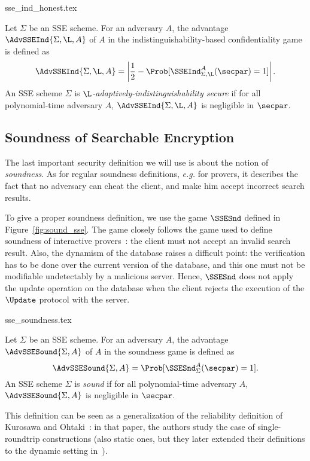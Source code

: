 {sse_ind_honest.tex}

\begin{definition}
	\label{def:sse_ind_conf}
	Let $\Sigma$ be an SSE scheme.
	For an adversary $A$, the advantage $\AdvSSEInd{\Sigma,\L,A}$ of $A$ in the indistinguishability-based confidentiality game is defined as
	\[
	\AdvSSEInd{\Sigma,\L,A} = \left|\frac{1}{2} - \Prob[\SSEInd^A_{\Sigma,\L}(\secpar) = 1 ] \right|.
	\]
	An SSE scheme $\Sigma$ is \emph{$\L$-adaptively-indistinguishability secure} if for all polynomial-time adversary $A$, $\AdvSSEInd{\Sigma,\L,A}$  is negligible in $\secpar$.
\end{definition}



\subsection{Soundness of Searchable Encryption} %
\label{sub:se_soundness}

The last important security definition we will use is about the notion of \emph{soundness}.
As for regular soundness definitions, \emph{e.g.} for provers, it describes the fact that no adversary can cheat the client, and make him accept incorrect search results. 

To give a proper soundness definition, we use the game $\SSESnd$ defined in Figure~\ref{fig:sound_sse}.
The game closely follows the game used to define soundness of interactive provers~\cite{BOOK:Goldreich04}: the client must not accept an invalid search result.
Also, the dynamism of the database raises a difficult point: the verification has to be done over the current version of the database, and this one must not be modifiable undetectably by a malicious server. 
Hence, $\SSESnd$ does not apply the update operation on the database when the client rejects the execution of the $\Update$ protocol with the server. 

{sse_soundness.tex}

\begin{definition}
	Let $\Sigma$ be an SSE scheme.
	For an adversary $A$, the advantage $\AdvSSESound{\Sigma,A}$ of $A$ in the soundness game is defined as
	\[
	\AdvSSESound{\Sigma,A} = \Prob[\SSESnd^A_\Sigma(\secpar) = 1 ].
	\]
	An SSE scheme $\Sigma$ is \emph{sound} if for all polynomial-time adversary $A$, $\AdvSSESound{\Sigma,A}$  is negligible in $\secpar$.
\end{definition}

This definition can be seen as a generalization of the reliability definition of Kurosawa and Ohtaki~\cite{FC:KurOht12}: in that paper, the authors study the case of single-roundtrip constructions (also static ones, but they later extended their definitions to the dynamic setting in~\cite{CANS:KurOht13}).


